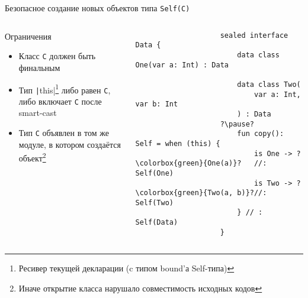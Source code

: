 \documentclass[aspectratio=169,usenames,dvipsnames]{beamer}
\begin{document}
    \begin{frame}[fragile]{Безопасное создание новых объектов типа \texttt{Self(C)}}
        \begin{columns}[onlytextwidth]
            \begin{column}[t]{0.46\textwidth}
                \begin{block}{Ограничения}
                    \begin{itemize}
                        \item Класс \texttt{C} должен быть финальным
                        \item Тип \texttt|this|\footnote{Ресивер текущей декларации (c типом bound'а Self-типа)} либо равен \texttt{С}, либо включает \texttt{C} после smart-cast
                        \item Тип \texttt{C} объявлен в том же модуле, в котором создаётся объект\footnote{Иначе открытие класса нарушало совместимость исходных кодов}
                    \end{itemize}
                \end{block}
            \end{column}\hfill%
            \begin{column}[t]{0.50\textwidth}
                \pause
                \begin{verbatim}
                    sealed interface Data {
                        data class One(var a: Int) : Data

                        data class Two(
                            var a: Int, var b: Int
                        ) : Data
                    ?\pause?
                        fun copy(): Self = when (this) {
                            is One -> ?\colorbox{green}{One(a)}?   //: Self(One)
                            is Two -> ?\colorbox{green}{Two(a, b)}?//: Self(Two)
                        } // : Self(Data)
                    }
                \end{verbatim}
            \end{column}
        \end{columns}
    \end{frame}
\end{document}
